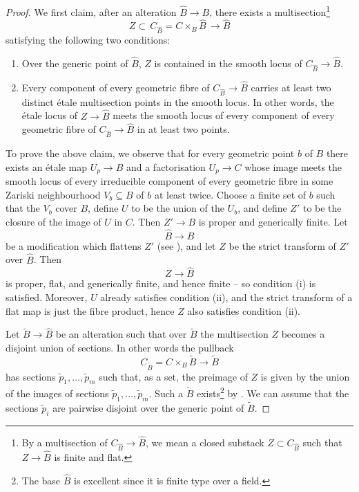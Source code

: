 \documentclass[a4paper,12pt]{article} %
\newcommand{\sub}{\subseteq}
\theoremstyle{definition}
\theoremstyle{plain}%
\newcommand{\jocomment}[1]{}
\begin{document}
\begin{proof}
We first claim, after an alteration %
$\widehat{B}\to B$,
there exists a multisection\footnote{By a multisection of $C_{\widehat{B}}\to \widehat{B}$,
we mean a closed substack $Z \subset C_{\widehat{B}}$ such that $Z \to \widehat{B}$ is finite and flat.} 
$$Z \subset \, C_{\widehat{B}}=C\times_B \widehat{B}\,  \to \widehat{B}$$ satisfying the following
two conditions:
\begin{enumerate}[label=\roman*)]
    \item[(i)] Over the generic point of $\widehat{B}$, $Z$ is contained in the smooth locus of $C_{\widehat{B}} \to \widehat{B}$.
    \item[(ii)] Every component of every geometric fibre of $C_{\widehat{B}}\to \widehat{B}$  carries at least two  distinct \'etale multisection points in the smooth locus. In other words, the \'etale locus of $Z \to \widehat{B}$ meets the smooth locus of every component of every geometric fibre of $C_{\widehat{B}} \to \widehat{B}$ in at least two points.
\end{enumerate}
To prove the above claim, we observe that for every geometric point $b$ of $B$ there exists an \'etale map $U_p \to B$ and a factorisation $U_p \to C$ whose image meets
the smooth locus of every irreducible component of every geometric fibre in some Zariski neighbourhood $V_b\sub B$ of $b$ at least twice. Choose a finite set of $b$ such that the $V_b$ cover $B$, define $U$ to be the union of the $U_b$, and define $Z'$ to be the closure of the image of $U$ in $C$.  Then $Z' \to B$ is proper and generically finite. 
Let $$\widehat B \to B$$ 
be a modification which flattens $Z'$ (see \cite{Raynaud-Gruson}), and let $Z$ be the strict transform of $Z'$ over $\widehat B$. Then $$Z \to \widehat B$$
is proper, flat, and generically finite, and hence  finite -- so condition (i) is
satisfied. Moreover, $U$ already satisfies condition (ii), and the strict transform of a flat map is just the fibre product, hence $Z$ also satisfies condition (ii). 

Let $\widetilde B \to \widehat B$ be an alteration such that over $\widetilde B$ the multisection $Z$ becomes a disjoint union of sections. 
In other words the pullback 
$$C_{\widetilde{B}}= C \times_B \widetilde B \to \widetilde B$$
has sections $\widetilde p_1, \ldots, \widetilde p_m$ such that, as a set, 
the preimage of $Z$ is given by the union of the images of sections $\widetilde p_1, \ldots, \widetilde p_m$. Such a $\widetilde B$ exists{\footnote{The base $\widehat B$ is excellent since it is finite type over a field.}}
by \cite[Lemma 5.6]{Jong1996Smoothness-semi}.
We can assume that the sections $\widetilde p_i$ are pairwise disjoint over the generic point of $\widetilde B$.


\end{proof}
\end{document}
